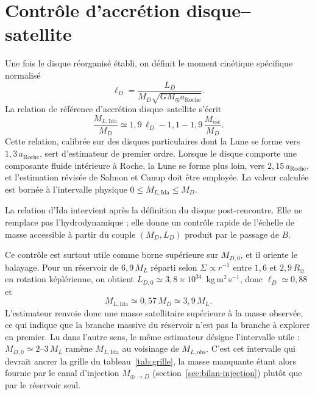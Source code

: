 \documentclass[11pt,a4paper,openany]{report}
\newcommand{\Mt}{M_{\oplus}}
\newcommand{\Rt}{R_{\oplus}}
\newcommand{\aR}{a_{\mathrm{Roche}}}
\begin{document}
\section{Contrôle d'accrétion disque--satellite}

Une fois le disque réorganisé établi, on définit le moment cinétique spécifique normalisé
\begin{equation}
\ell_D=\frac{L_D}{M_D\sqrt{G\Mt\aR}}.
\label{eq:lD}
\end{equation}
La relation de référence d'accrétion disque--satellite \cite{Ida1997} s'écrit
\begin{equation}
\frac{M_{L,\mathrm{Ida}}}{M_D}\simeq1{,}9\,\ell_D-1{,}1-1{,}9\,\frac{M_{\mathrm{esc}}}{M_D}.
\label{eq:Ida}
\end{equation}
Cette relation, calibrée sur des disques particulaires dont la Lune se forme vers $1{,}3\,\aR$,
sert d'estimateur de premier ordre. Lorsque le disque comporte une composante fluide
intérieure à Roche, la Lune se forme plus loin, vers $2{,}15\,\aR$, et l'estimation révisée de
Salmon et Canup \cite{SalmonCanup2012} doit être employée. La valeur calculée est bornée à
l'intervalle physique $0\le M_{L,\mathrm{Ida}}\le M_D$.

\begin{lecture}
La relation d'Ida intervient après la définition du disque post-rencontre. Elle ne remplace pas
l'hydrodynamique ; elle donne un contrôle rapide de l'échelle de masse accessible à partir du
couple $(M_D,L_D)$ produit par le passage de $B$.
\end{lecture}

\begin{controle}
Ce contrôle est surtout utile comme borne supérieure sur $M_{D,0}$, et il oriente le balayage.
Pour un réservoir de $6{,}9\,M_L$ réparti selon $\Sigma\propto r^{-1}$ entre $1{,}6$ et
$2{,}9\,\Rt$ en rotation képlérienne, on obtient
$L_{D,0}\simeq3{,}8\times10^{34}$~kg\,m$^2$\,s$^{-1}$, donc $\ell_D\simeq0{,}88$ et
\begin{equation}
M_{L,\mathrm{Ida}}\simeq0{,}57\,M_D\simeq3{,}9\,M_L.
\label{eq:controle-Ida}
\end{equation}
L'estimateur renvoie donc une masse satellitaire supérieure à la masse observée, ce qui indique que
la branche massive du réservoir n'est pas la branche à explorer en premier. Lu dans l'autre sens, le
même estimateur désigne l'intervalle utile : $M_{D,0}\simeq2$--$3\,M_L$ ramène
$M_{L,\mathrm{Ida}}$ au voisinage de $M_{L,\mathrm{obs}}$. C'est cet intervalle qui devrait ancrer
la grille du tableau~\ref{tab:grille}, la masse manquante étant alors fournie par le canal
d'injection $M_{\oplus\to D}$ (section~\ref{sec:bilan-injection}) plutôt que par le réservoir seul.
\end{controle}
\end{document}
